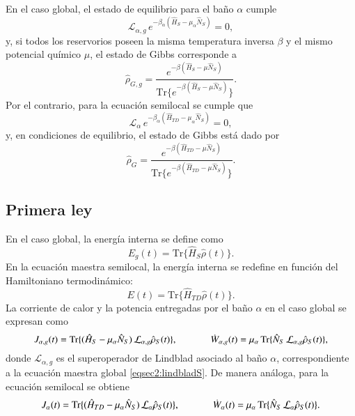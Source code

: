En el caso global, el estado de equilibrio para el baño $\alpha$ cumple
\begin{equation*}
    \mathcal{L}_{\alpha,g}\,e^{-\beta_{\alpha}(\hat{H}_{S} - \mu_{\alpha}\hat{N}_{S})} = 0,
\end{equation*}
y, si todos los reservorios poseen la misma temperatura inversa $\beta$ y el mismo potencial químico $\mu$, 
el estado de Gibbs corresponde a
\begin{equation*}
    \hat{\rho}_{G,g} = \frac{e^{-\beta(\hat{H}_{S} - \mu \hat{N}_{S})}}{\text{Tr}\{ e^{-\beta(\hat{H}_{S} - \mu \hat{N}_{S})}\}}.
\end{equation*}
Por el contrario, para la ecuación semilocal se cumple que
\begin{equation}
    \mathcal{L}_{\alpha}\,e^{-\beta_{\alpha}(\hat{H}_{TD} - \mu_{\alpha}\hat{N}_{S})} = 0,
    \label{sec2cerolaw}
\end{equation}
y, en condiciones de equilibrio, el estado de Gibbs está dado por
\begin{equation*}
    \hat{\rho}_{G} = \frac{e^{-\beta(\hat{H}_{TD} - \mu \hat{N}_{S})}}{\text{Tr}\{ e^{-\beta(\hat{H}_{TD} - \mu \hat{N}_{S})}\}}.
\end{equation*}


\subsection*{Primera ley}

En el caso global, la energía interna se define como
\begin{equation*}
    E_{g}(t) = \text{Tr}\{\hat{H}_{S}\hat{\rho}(t)\}.
\end{equation*}
En la ecuación maestra semilocal, la energía interna se redefine en función del Hamiltoniano termodinámico:
\begin{equation}
    E(t) = \text{Tr}\{\hat{H}_{TD}\hat{\rho}(t)\}.
    \label{sec2:energyeq}
\end{equation}
La corriente de calor y la potencia entregadas por el baño $\alpha$ en el caso global se expresan como
\begin{equation*}
    J_{\alpha,g}(t) = \text{Tr}\{(\hat{H}_{S} - \mu_{\alpha}\hat{N}_S)\,\mathcal{L}_{\alpha,g}\hat{\rho}_{S}(t)\}, 
    \hspace{12mm} 
    \dot{W}_{\alpha,g}(t) = \mu_{\alpha}\,\text{Tr}\{\hat{N}_{S}\,\mathcal{L}_{\alpha,g}\hat{\rho}_{S}(t)\},
\end{equation*}
donde $\mathcal{L}_{\alpha,g}$ es el superoperador de Lindblad asociado al baño $\alpha$, correspondiente a la ecuación maestra global \eqref{eqsec2:lindbladS}.
De manera análoga, para la ecuación semilocal se obtiene
\begin{equation}
    J_{\alpha}(t) = \text{Tr}\{(\hat{H}_{TD} - \mu_{\alpha}\hat{N}_S)\,\mathcal{L}_{\alpha}\hat{\rho}_{S}(t)\}, 
    \hspace{12mm} 
    \dot{W}_{\alpha}(t) = \mu_{\alpha}\,\text{Tr}\{\hat{N}_{S}\,\mathcal{L}_{\alpha}\hat{\rho}_{S}(t)\}.
    \label{sec2:heatworkeq}
\end{equation}

